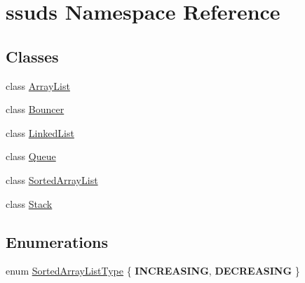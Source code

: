\hypertarget{namespacessuds}{}\section{ssuds Namespace Reference}
\label{namespacessuds}
\subsection*{Classes}
\begin{DoxyCompactItemize}
\item 
class \mbox{\hyperlink{classssuds_1_1_array_list}{Array\+List}}
\item 
class \mbox{\hyperlink{classssuds_1_1_bouncer}{Bouncer}}
\item 
class \mbox{\hyperlink{classssuds_1_1_linked_list}{Linked\+List}}
\item 
class \mbox{\hyperlink{classssuds_1_1_queue}{Queue}}
\item 
class \mbox{\hyperlink{classssuds_1_1_sorted_array_list}{Sorted\+Array\+List}}
\item 
class \mbox{\hyperlink{classssuds_1_1_stack}{Stack}}
\end{DoxyCompactItemize}
\subsection*{Enumerations}
\begin{DoxyCompactItemize}
\item 
enum \mbox{\hyperlink{namespacessuds_a21d5ba2a8737547c6ec7c450072498e1}{Sorted\+Array\+List\+Type}} \{ {\bfseries I\+N\+C\+R\+E\+A\+S\+I\+NG}, 
{\bfseries D\+E\+C\+R\+E\+A\+S\+I\+NG}
 \}
\end{DoxyCompactItemize}

